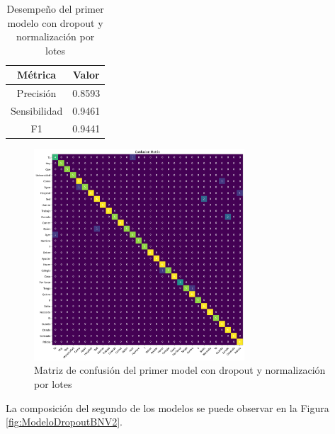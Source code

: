 \begin{table}[H]
    \centering
    \begin{tabular}{|c|c|}
        \hline
        \textbf{Métrica} & \textbf{Valor} \\
        \hline
        Precisión & 0.8593 \\
        \hline
        Sensibilidad & 0.9461 \\
        \hline
        F1 & 0.9441 \\
        \hline
    \end{tabular}
    \caption{Desempeño del primer modelo con dropout y normalización por lotes}
    \label{tab:DesempeñoModeloDropoutBN}
\end{table}

\begin{figure}[H]
    \centering
    \includegraphics[width=0.7\textwidth]{figuras/modelDropoutBNCM.png}
    \caption{Matriz de confusión del primer model con dropout y normalización por lotes}
    \label{fig:CMModeloDropoutBN}
\end{figure}

La composición del segundo de los modelos se puede observar en la Figura \ref{fig:ModeloDropoutBNV2}.


